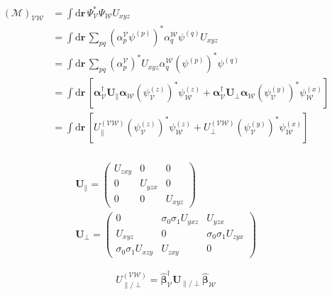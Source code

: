 \begin{align*}
    (\bm{\mathcal{M}})_{\mathcal{V}\mathcal{W}}
    & =
        \int \mathrm{d}\bm{r}\,
        \Psi_{\mathcal{V}}^{*}
        \Psi_{\mathcal{W}}
        U_{xyz}
    \\
    & =
        \int \mathrm{d}\bm{r}\,
        \sum_{pq}
        \left(\alpha_{p}^{\mathcal{V}}\psi^{(p)}\right)^{*}
        \alpha_{q}^{\mathcal{W}}\psi^{(q)}
        U_{xyz}
    \\
    & =
        \int \mathrm{d}\bm{r}\,
        \sum_{pq}
        \left(\alpha_{p}^{\mathcal{V}}\right)^{*}
        U_{xyz}
        \alpha_{q}^{\mathcal{W}}
        \left(\psi^{(p)}\right)^{*}
        \psi^{(q)}
    \\
    & =
        \int \mathrm{d}\bm{r}\,
        \left[
        \bm{\alpha}_{\mathcal{V}}^{\dagger}
        \bm{U}_{\parallel}
        \bm{\alpha}_{\mathcal{W}}
        \left(\psi_{\mathcal{V}}^{(z)}\right)^{*}
        \psi_{\mathcal{W}}^{(z)} 
        +
        \bm{\alpha}_{\mathcal{V}}^{\dagger}
        \bm{U}_{\perp}
        \bm{\alpha}_{\mathcal{W}}
        \left(\psi_{\mathcal{V}}^{(y)}\right)^{*}
        \psi_{\mathcal{W}}^{(x)}
        \right]
    \\
    & =
        \int \mathrm{d}\bm{r}\,
        \left[
        U_{\parallel}^{\left(\mathcal{V}\mathcal{W}\right)}
        \left(\psi_{\mathcal{V}}^{(z)}\right)^{*}
        \psi_{\mathcal{W}}^{(z)} 
        +
        U_{\perp}^{\left(\mathcal{V}\mathcal{W}\right)}
        \left(\psi_{\mathcal{V}}^{(y)}\right)^{*}
        \psi_{\mathcal{W}}^{(x)} 
        \right]
    \\
\end{align*}

\begin{align}
    \bm{U}_{\parallel}
    =
        \begin{pmatrix}
            U_{zxy} & 0       & 0       \\
            0       & U_{yzx} & 0       \\
            0       & 0       & U_{xyz}
        \end{pmatrix}
    \\
    \bm{U}_{\perp}
    =
        \begin{pmatrix}
            0 & \sigma_{0}\sigma_{1}U_{yxz} & U_{yzx} \\
            U_{xyz} & 0 & \sigma_{0}\sigma_{1}U_{zyx} \\
            \sigma_{0}\sigma_{1}U_{xzy} & U_{zxy} & 0
        \end{pmatrix}
\end{align}

\begin{equation}
    U_{\parallel\slash\perp}^{\left(\mathcal{V}\mathcal{W}\right)}
    = 
    \hat{\bm{\beta}}_{\mathcal{V}}^{\dagger}
    \bm{U}_{\parallel\slash\perp}
    \hat{\bm{\beta}}_{\mathcal{W}}
\end{equation}



% 






